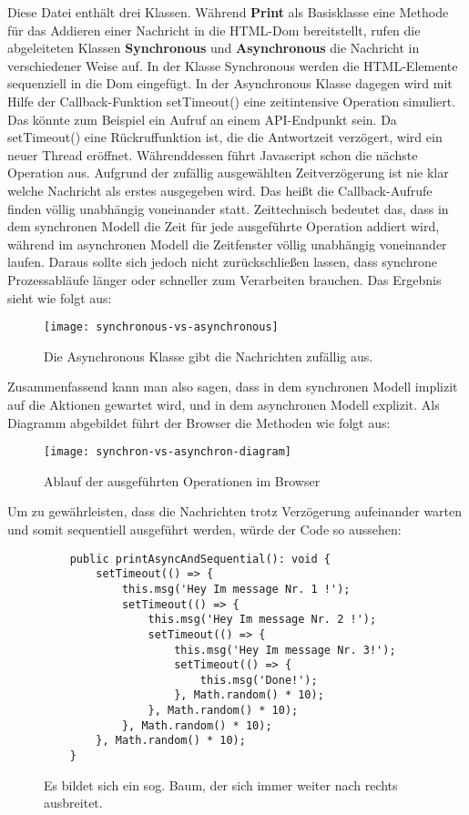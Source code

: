 \noindent
Diese Datei enthält drei Klassen. Während \textbf{Print} als Basisklasse eine Methode für das Addieren einer Nachricht in die HTML-Dom bereitstellt, rufen die abgeleiteten Klassen \textbf{Synchronous} und \textbf{Asynchronous} die Nachricht in verschiedener Weise auf. In der Klasse Synchronous werden die HTML-Elemente sequenziell in die Dom eingefügt. In der Asynchronous Klasse dagegen wird mit Hilfe der Callback-Funktion setTimeout() eine zeitintensive Operation simuliert. Das könnte zum Beispiel ein Aufruf an einem API-Endpunkt sein. Da setTimeout() eine Rückruffunktion ist, die die Antwortzeit verzögert, wird ein neuer Thread eröffnet. Währenddessen führt Javascript schon die nächste Operation aus. Aufgrund der zufällig ausgewählten Zeitverzögerung ist nie klar welche Nachricht als erstes ausgegeben wird. Das heißt die Callback-Aufrufe finden völlig unabhängig voneinander statt. Zeittechnisch bedeutet das, dass in dem synchronen Modell die Zeit für jede ausgeführte Operation addiert wird, während im asynchronen Modell die Zeitfenster völlig unabhängig voneinander laufen. Daraus sollte sich jedoch nicht zurückschließen lassen, dass synchrone Prozessabläufe länger oder schneller zum Verarbeiten brauchen.
Das Ergebnis sieht wie folgt aus:

\begin{figure}[H]
\centering
\texttt{[image: synchronous-vs-asynchronous]}
\caption{Die Asynchronous Klasse gibt die Nachrichten zufällig aus.}
\end{figure}

\noindent
Zusammenfassend kann man also sagen, dass in dem synchronen Modell implizit auf die Aktionen gewartet wird, und in dem asynchronen Modell explizit. Als Diagramm abgebildet führt der Browser die Methoden wie folgt aus:

\begin{center}
\begin{figure}[H]
\texttt{[image: synchron-vs-asynchron-diagram]}
\caption{Ablauf der ausgeführten Operationen im Browser}
\end{figure}
\end{center}

\noindent
Um zu gewährleisten, dass die Nachrichten trotz Verzögerung aufeinander warten und somit sequentiell ausgeführt werden, würde der Code so aussehen:

\begin{figure}[H]
\begin{lstlisting}
    public printAsyncAndSequential(): void {
        setTimeout(() => {
            this.msg('Hey Im message Nr. 1 !');
            setTimeout(() => {
                this.msg('Hey Im message Nr. 2 !');
                setTimeout(() => {
                    this.msg('Hey Im message Nr. 3!');
                    setTimeout(() => {
                        this.msg('Done!');
                    }, Math.random() * 10);
                }, Math.random() * 10);
            }, Math.random() * 10);
        }, Math.random() * 10);
    }
\end{lstlisting}
\caption{Es bildet sich ein sog. Baum, der sich immer weiter nach rechts ausbreitet.}
\end{figure}


